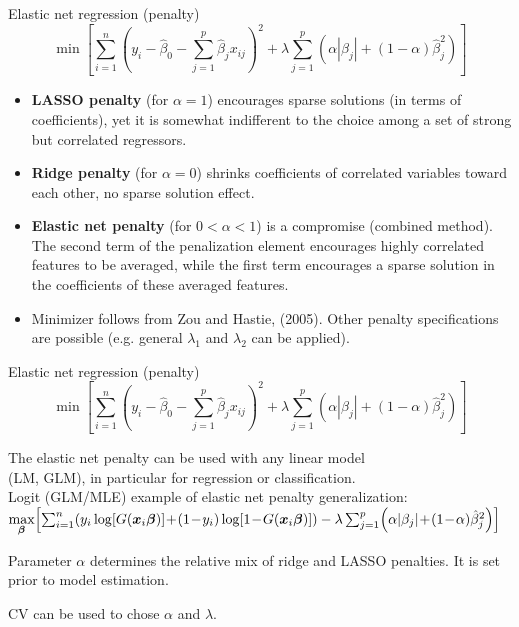 \documentclass{beamer}
\begin{document}
\begin{frame}{Elastic net regression (penalty)}
$$\min \left[ \sum_{i=1}^n \left(y_i - \hat{\beta}_0 
         - \sum_{j=1}^p  \hat{\beta}_j x_{ij} \right)^2 
         \! + \lambda \sum_{j=1}^p 
         \left( \alpha |\beta_j| + (1-\alpha) \hat{\beta}_j^2 \right) \right]
$$
\small
\begin{itemize}
\item \textbf{LASSO penalty} (for $\alpha = 1$) encourages sparse solutions (in terms of coefficients), yet it is somewhat indifferent to the choice among a set of strong but correlated regressors.
\smallskip
\item \textbf{Ridge penalty} (for $\alpha = 0$) shrinks coefficients of correlated variables toward each other, no sparse solution effect.
\smallskip
\item \textbf{Elastic net penalty} (for $0 < \alpha < 1$) is a compromise (combined method). The second term of the penalization element encourages highly correlated features to be averaged, while
the first term encourages a sparse solution in the coefficients of these averaged features.
\item Minimizer follows from Zou and Hastie, (2005). Other penalty specifications are possible (e.g. general $\lambda_1$ and $\lambda_2$ can be applied).
\end{itemize}
\end{frame}
\begin{frame}{Elastic net regression (penalty)}
$$\min \left[ \sum_{i=1}^n \left(y_i - \hat{\beta}_0 
         - \sum_{j=1}^p  \hat{\beta}_j x_{ij} \right)^2 
         \! + \lambda \sum_{j=1}^p 
         \left( \alpha |\beta_j| + (1-\alpha) \hat{\beta}_j^2 \right) \right]
$$
\begin{itemize}
\item The elastic net penalty can be used with any linear model \\(LM, GLM), in particular for regression or classification.\\
Logit (GLM/MLE) example of elastic net penalty generalization:\\
\footnotesize{$\underset{\bm{\beta}}{\textnormal{max}}\!
\left[
\sum_{i=1}^n \!\left( y_i \log [G(\bm{x}_i\bm{\beta})] \!+\! 
(1\!-\!y_i) \log [1\!-\!G(\bm{x}_i\bm{\beta})]
\right)
- \lambda \sum_{j=1}^p \!\left( \alpha |\beta_j|\!+\!(1\!-\!\alpha) \hat{\beta}_j^2 \right)
\right]$}
\smallskip
\normalsize{
\item Parameter $\alpha$ determines the relative mix of ridge and LASSO penalties. It is set prior to model estimation.
\medskip
\item CV can be used to chose $\alpha$ and $\lambda$.}
\end{itemize}
\end{frame}
\end{document}

